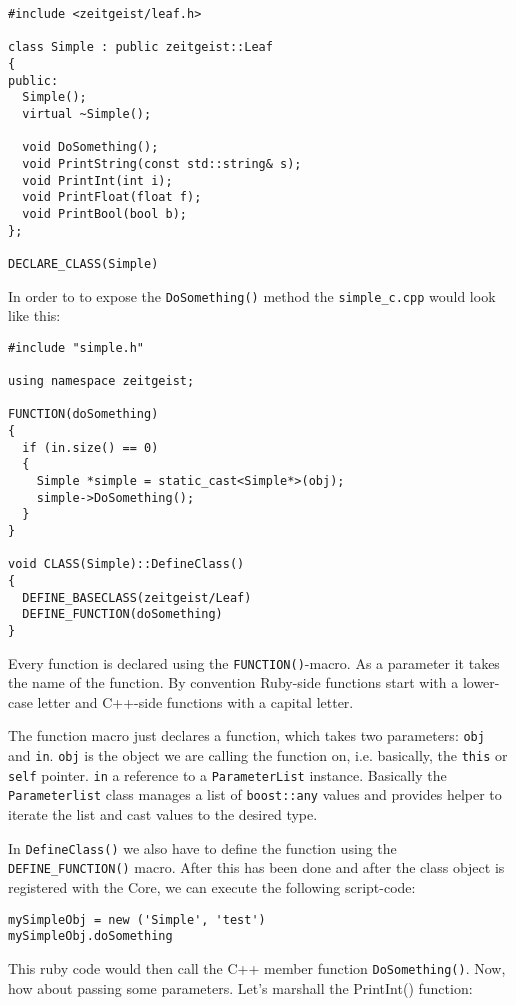 \begin{verbatim}
#include <zeitgeist/leaf.h>

class Simple : public zeitgeist::Leaf
{
public:
  Simple();
  virtual ~Simple();
  
  void DoSomething();
  void PrintString(const std::string& s);
  void PrintInt(int i);
  void PrintFloat(float f);
  void PrintBool(bool b);
};

DECLARE_CLASS(Simple)
\end{verbatim}

In order to to expose the \texttt{DoSomething()} method the
\texttt{simple\_c.cpp} would look like this:

\begin{verbatim}
#include "simple.h"

using namespace zeitgeist;

FUNCTION(doSomething)
{
  if (in.size() == 0)
  {
    Simple *simple = static_cast<Simple*>(obj);
    simple->DoSomething();
  }
}

void CLASS(Simple)::DefineClass()
{
  DEFINE_BASECLASS(zeitgeist/Leaf)
  DEFINE_FUNCTION(doSomething)
}
\end{verbatim}


Every function is declared using the \texttt{FUNCTION()}-macro. As a
parameter it takes the name of the function. By convention Ruby-side
functions start with a lower-case letter and C++-side functions with a
capital letter. 

The function macro just declares a function, which takes two
parameters: \texttt{obj} and \texttt{in}. \texttt{obj} is the object
we are calling the function on, i.e. basically, the \texttt{this} or
\texttt{self} pointer. \texttt{in} a reference to a \texttt{ParameterList} 
instance. Basically the \texttt{Parameterlist} class manages a list of
\texttt{boost::any} values and provides helper to iterate the list and cast 
values to the desired type.

In \texttt{DefineClass()} we also have to define the function using
the \texttt{DEFINE\_FUNCTION()} macro. After this has been done and
after the class object is registered with the Core, we can execute the
following script-code:

\begin{verbatim}
mySimpleObj = new ('Simple', 'test')
mySimpleObj.doSomething
\end{verbatim}

This ruby code would then call the C++ member function
\texttt{DoSomething()}. Now, how about passing some parameters. Let's marshall
the PrintInt() function:

